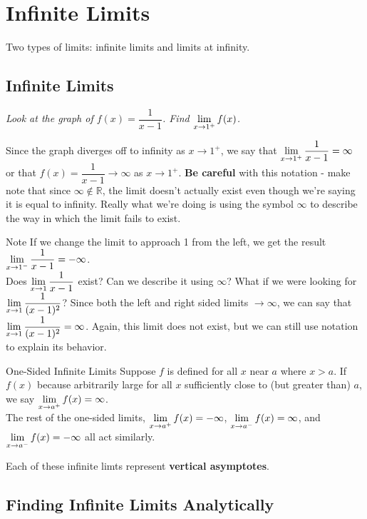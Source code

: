 \section{Infinite Limits}


Two types of limits: infinite limits and limits at infinity.

\subsection*{Infinite Limits}

\textit{Look at the graph of $f(x) = \dfrac{1}{x-1}$. Find $\displaystyle \lim_{x\to1^+} f(x)$.}

Since the graph diverges off to infinity as $x\to1^+$, we say that $\displaystyle \lim_{x\to1^+} \frac{1}{x-1} = \infty$ or that $f(x) = \dfrac{1}{x-1}\to \infty$ as $x\to 1^+$. \textbf{Be careful} with this notation - make note that since $\infty \notin \mathbb{R}$, the limit doesn't actually exist even though we're saying it is equal to infinity. Really what we're doing is using the symbol $\infty$ to describe the way in which the limit fails to exist.

\begin{note}{Note}
If we change the limit to approach 1 from the left, we get the result $\displaystyle \lim_{x\to1^-} \frac{1}{x-1} = -\infty$.\\

Does $\displaystyle \lim_{x\to 1} \frac{1}{x-1}$ exist? Can we describe it using $\infty$? What if we were looking for $\displaystyle \lim_{x\to1} \frac{1}{(x-1)^2}$? Since both the left and right sided limits $\to \infty$, we can say that $\displaystyle \lim_{x\to1} \frac{1}{(x-1)^2}=\infty$. Again, this limit does not exist, but we can still use notation to explain its behavior.
\end{note}

\begin{defn}{One-Sided Infinite Limits}
Suppose $f$ is defined for all $x$ near $a$ where $x>a$. If $f(x)$ because arbitrarily large for all $x$ sufficiently close to (but greater than) $a$, we say $\displaystyle \lim_{x\to a^+}f(x)=\infty$.\\

The rest of the one-sided limits, $\displaystyle \lim_{x\to a^+}f(x)=-\infty$, $\displaystyle \lim_{x\to a^-}f(x)=\infty$, and $\displaystyle \lim_{x\to a^-}f(x)=-\infty$ all act similarly.
\end{defn}

Each of these infinite limts represent \textbf{vertical asymptotes}.

\subsection*{Finding Infinite Limits Analytically}

